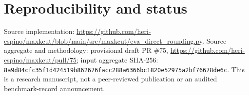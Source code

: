\documentclass[10pt,letterpaper]{article}
\begin{document}
\section*{Reproducibility and status}
Source implementation: \url{https://github.com/heri-espino/maxkcut/blob/main/src/maxkcut/eva_direct_rounding.py}. Source aggregate and methodology: provisional draft PR \#75, \url{https://github.com/heri-espino/maxkcut/pull/75}; input aggregate SHA-256: \texttt{8a9d84cfc35f1d424519b862676facc288a6366bc1820e52975a2bf76678de6c}. This is a research manuscript, not a peer-reviewed publication or an audited benchmark-record announcement.



\end{document}
